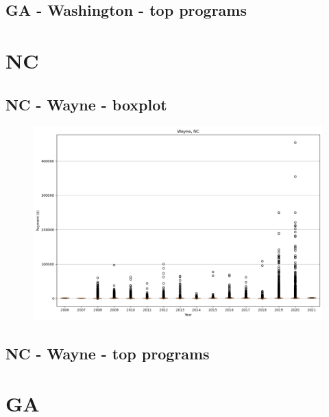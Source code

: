 \subsection*{GA - Washington - top programs}

\newpage
\section*{NC}
\subsection*{NC - Wayne - boxplot}
\begin{figure}[h]
\centering
\includegraphics[width=7in]{../output/boxplots/counties/Wayne-NC_boxplot.png}
\end{figure}


\subsection*{NC - Wayne - top programs}

\newpage
\section*{GA}
